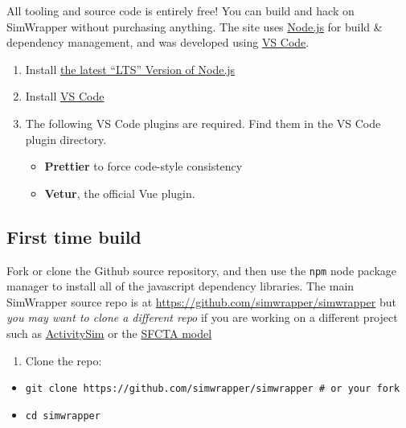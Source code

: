 All tooling and source code is entirely free! You can build and hack on
SimWrapper without purchasing anything. The site uses
\href{https://nodejs.org}{Node.js} for build \& dependency management,
and was developed using \href{https://code.visualstudio.com/}{VS Code}.

\begin{enumerate}
\def\labelenumi{\arabic{enumi}.}
\tightlist
\item
  Install \href{https://nodejs.org/en/}{the latest ``LTS'' Version of
  Node.js}
\item
  Install \href{https://code.visualstudio.com/}{VS Code}
\item
  The following VS Code plugins are required. Find them in the VS Code
  plugin directory.

  \begin{itemize}
  \tightlist
  \item
    \textbf{Prettier} to force code-style consistency
  \item
    \textbf{Vetur}, the official Vue plugin.
  \end{itemize}
\end{enumerate}

\hypertarget{first-time-build}{%
\subsection{First time build}\label{first-time-build}}

Fork or clone the Github source repository, and then use the
\texttt{npm} node package manager to install all of the javascript
dependency libraries. The main SimWrapper source repo is at
\url{https://github.com/simwrapper/simwrapper} but \emph{you may want to
clone a different repo} if you are working on a different project such
as \href{https://github.com/ActivitySim/dashboard}{ActivitySim} or the
\href{https://github.com/sfcta/simwrapper}{SFCTA model}

\begin{enumerate}
\def\labelenumi{\arabic{enumi}.}
\tightlist
\item
  Clone the repo:
\end{enumerate}

\begin{itemize}
\tightlist
\item
  \texttt{git\ clone\ https://github.com/simwrapper/simwrapper\ \#\ or\ your\ fork}
\item
  \texttt{cd\ simwrapper}
\end{itemize}

